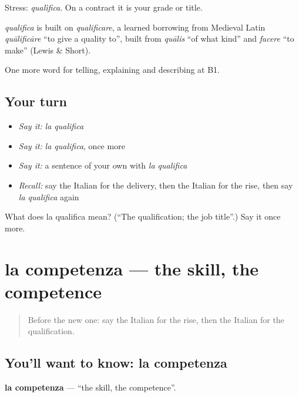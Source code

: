 Stress: \emph{qualìfica}. On a contract it is your grade or title.

\begin{cousinweb}
\emph{qualifica} is built on \emph{qualificare}, a learned borrowing from Medieval Latin \emph{quālificāre} \textquotedblleft{}to give a quality to\textquotedblright{}, built from \emph{quālis} \textquotedblleft{}of what kind\textquotedblright{} and \emph{facere} \textquotedblleft{}to make\textquotedblright{} (Lewis \& Short).
\end{cousinweb}

\begin{grammarlens}[title={What you've built}]
One more word for telling, explaining and describing at B1.
\end{grammarlens}

\subsection*{Your turn}
\begin{itemize}
\raggedright
  \item \emph{Say it:} \emph{la qualifica}
  \item \emph{Say it:} \emph{la qualifica}, once more
  \item \emph{Say it:} a sentence of your own with \emph{la qualifica}
  \item \emph{Recall:} say the Italian for the delivery, then the Italian for the rise, then say \emph{la qualifica} again
\end{itemize}

\begin{tcolorbox}[breakable,colback=teal!4,colframe=teal!35!black,title={Before you move on}]
What does la qualifica mean? (\textquotedblleft{}The qualification; the job title\textquotedblright{}.) Say it once more.
\end{tcolorbox}
\section[la competenza]{la competenza — the skill, the competence}

\label{lesson:IT-C361-competenza}



\begin{quote}
Before the new one: say the Italian for the rise, then the Italian for the qualification.
\end{quote}

\subsection*{You'll want to know: la competenza}
\textbf{la competenza} — \textquotedblleft{}the skill, the competence\textquotedblright{}.

